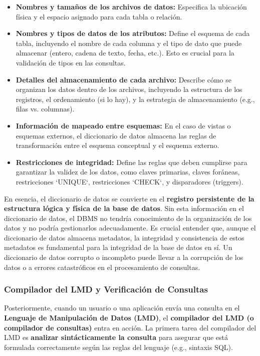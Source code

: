 \begin{itemize}
    \item \textbf{Nombres y tamaños de los archivos de datos:}  Especifica la ubicación física y el espacio asignado para cada tabla o relación.
    \item \textbf{Nombres y tipos de datos de los atributos:} Define el esquema de cada tabla, incluyendo el nombre de cada columna y el tipo de dato que puede almacenar (entero, cadena de texto, fecha, etc.).  Esto es crucial para la validación de tipos en las consultas.
    \item \textbf{Detalles del almacenamiento de cada archivo:}  Describe cómo se organizan los datos dentro de los archivos, incluyendo la estructura de los registros, el ordenamiento (si lo hay), y la estrategia de almacenamiento (e.g., filas vs. columnas).
    \item \textbf{Información de mapeado entre esquemas:}  En el caso de vistas o esquemas externos, el diccionario de datos almacena las reglas de transformación entre el esquema conceptual y el esquema externo.
    \item \textbf{Restricciones de integridad:}  Define las reglas que deben cumplirse para garantizar la validez de los datos, como claves primarias, claves foráneas, restricciones `UNIQUE`, restricciones `CHECK`, y disparadores (triggers).
\end{itemize}

En esencia, el diccionario de datos se convierte en el \textbf{registro persistente de la estructura lógica y física de la base de datos}.  Sin esta información en el diccionario de datos, el DBMS no tendría conocimiento de la organización de los datos y no podría gestionarlos adecuadamente. Es crucial entender que, aunque el diccionario de datos almacena metadatos, la integridad y consistencia de estos metadatos es fundamental para la integridad de la base de datos en sí. Un diccionario de datos corrupto o incompleto puede llevar a la corrupción de los datos o a errores catastróficos en el procesamiento de consultas.

\subsubsection{Compilador del LMD y Verificación de Consultas}

Posteriormente, cuando un usuario o una aplicación envía una consulta en el \textbf{Lenguaje de Manipulación de Datos (LMD)}, el \textbf{compilador del LMD (o compilador de consultas)} entra en acción. La primera tarea del compilador del LMD es \textbf{analizar sintácticamente la consulta} para asegurar que está formulada correctamente según las reglas del lenguaje (e.g., sintaxis SQL).

